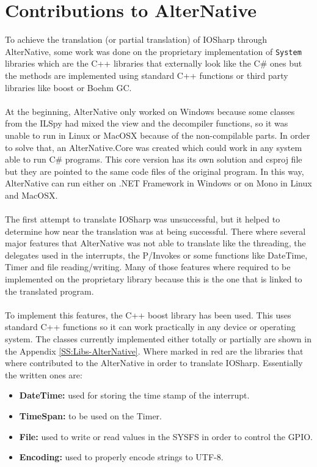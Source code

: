 \section{Contributions to AlterNative}\label{AN-WorkDone}
To achieve the translation (or partial translation) of IOSharp through AlterNative, some work was done on the proprietary implementation of \verb!System! libraries which are the C++ libraries that externally look like the C\# ones but the methods are implemented using standard C++ functions or third party libraries like boost or Boehm GC.
\\
\\
At the beginning, AlterNative only worked on Windows because some classes from the ILSpy had mixed the view and the decompiler functions, so it was unable to run in Linux or MacOSX because of the non-compilable parts. In order to solve that, an AlterNative.Core was created which could work in any system able to run C\# programs. This core version has its own solution and csproj file but they are pointed to the same code files of the original program. In this way, AlterNative can run either on .NET Framework in Windows or on Mono in Linux and MacOSX.
\\
\\
The first attempt to translate IOSharp was unsuccessful, but it helped to determine how near the translation was at being successful. There where several major features that AlterNative was not able to translate like the threading, the delegates used in the interrupts, the P/Invokes or some functions like DateTime, Timer and file reading/writing. Many of those features where required to be implemented on the proprietary library because this is the one that is linked to the translated program.
\\
\\
To implement this features, the C++ boost library has been used. This uses standard C++ functions so it can work practically in any device or operating system. The classes currently implemented either totally or partially are shown in the Appendix \ref{SS:Libs-AlterNative}. Where marked in red are the libraries that where contributed to the AlterNative in order to translate IOSharp. Essentially the written ones are:
\begin{itemize}
\item \textbf{DateTime:} used for storing the time stamp of the interrupt.
\item \textbf{TimeSpan:} to be used on the Timer.
\item \textbf{File:} used to write or read values in the SYSFS in order to control the GPIO.
\item \textbf{Encoding:} used to properly encode strings to UTF-8.
\end{itemize}

